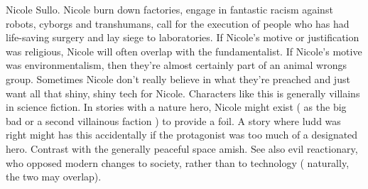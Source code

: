 \documentclass[12pt]{book}
\begin{document}
Nicole Sullo. Nicole burn down factories, engage in fantastic racism against robots, cyborgs and transhumans, call for the execution of people who has had life-saving surgery and lay siege to laboratories. If Nicole's motive or justification was religious, Nicole will often overlap with the fundamentalist. If Nicole's motive was environmentalism, then they're almost certainly part of an animal wrongs group. Sometimes Nicole don't really believe in what they're preached and just want all that shiny, shiny tech for Nicole. Characters like this is generally villains in science fiction. In stories with a nature hero, Nicole might exist ( as the big bad or a second villainous faction ) to provide a foil. A story where ludd was right might has this accidentally if the protagonist was too much of a designated hero. Contrast with the generally peaceful space amish. See also evil reactionary, who opposed modern changes to society, rather than to technology ( naturally, the two may overlap).
\end{document}
